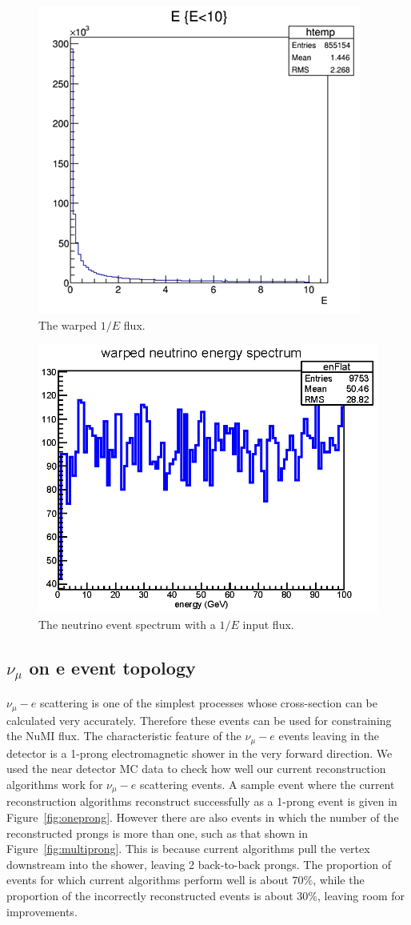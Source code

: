 \documentclass[12pt,a4paper,final]{iopart}
\begin{document}
\begin{figure}
  \centering
  \includegraphics[width=.4\textwidth]{figures/inverseEflux.png}
  \caption{The warped $1/E$ flux.}
  \label{fig:inverseEflux}
\end{figure}

\begin{figure}
  \centering
  \includegraphics[width=.7\textwidth]{figures/warped_event_spectrum.eps}
  \caption{The neutrino event spectrum with a $1/E$ input flux.}
  \label{fig:flatspec}
\end{figure}

\subsection[Numu on e Event Topology]{$\nu_\mu$ on e event topology}

$\nu_\mu-e$ scattering is one of the simplest processes whose cross-section can be calculated very accurately. Therefore these events can be used for constraining the NuMI flux. The characteristic feature of the $\nu_\mu-e$ events leaving in the detector is a 1-prong electromagnetic shower in the very forward direction.  We used the near detector MC data to check how well our current reconstruction algorithms work for $\nu_\mu-e$ scattering events. A sample event where the current reconstruction algorithms reconstruct successfully as a 1-prong event is given in Figure~\ref{fig:oneprong}. However there are also events in which the number of the reconstructed prongs is more than one, such as that shown in Figure~\ref{fig:multiprong}. This is because current algorithms pull the vertex downstream into the shower, leaving 2 back-to-back prongs. The proportion of events for which current algorithms perform well is about $70\%$, while the proportion of the incorrectly reconstructed events is about $30\%$, leaving room for improvements.
\end{document}
